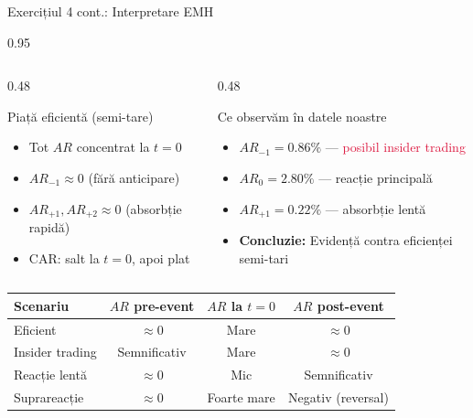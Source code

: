 \documentclass[9pt, aspectratio=169, t]{beamer}
\begin{document}
\begin{frame}{Exercițiul 4 cont.: Interpretare EMH}
    \begin{cminipage}{0.95\textwidth}
\begin{columns}[T]
\begin{column}{0.48\textwidth}
\begin{block}{Piață eficientă (semi-tare)}
\begin{itemize}\setlength{\itemsep}{0pt}
    \item Tot $AR$ concentrat la $t=0$
    \item $AR_{-1} \approx 0$ (fără anticipare)
    \item $AR_{+1}, AR_{+2} \approx 0$ (absorbție rapidă)
    \item CAR: salt la $t=0$, apoi plat
\end{itemize}
\end{block}
\end{column}
\begin{column}{0.48\textwidth}
\begin{block}{Ce observăm în datele noastre}
\begin{itemize}\setlength{\itemsep}{0pt}
    \item $AR_{-1} = 0.86\%$ --- \textcolor{Crimson}{posibil insider trading}
    \item $AR_0 = 2.80\%$ --- reacție principală
    \item $AR_{+1} = 0.22\%$ --- absorbție lentă
    \item \textbf{Concluzie:} Evidență contra eficienței semi-tari
\end{itemize}
\end{block}
\end{column}
\end{columns}

\vspace{0.3cm}
\renewcommand{\arraystretch}{1.2}
\begin{center}
\footnotesize
\begin{tabular}{lccc}
\toprule
\textbf{Scenariu} & \textbf{$AR$ pre-event} & \textbf{$AR$ la $t=0$} & \textbf{$AR$ post-event} \\
\midrule
Eficient & $\approx 0$ & Mare & $\approx 0$ \\
Insider trading & Semnificativ & Mare & $\approx 0$ \\
Reacție lentă & $\approx 0$ & Mic & Semnificativ \\
Suprareacție & $\approx 0$ & Foarte mare & Negativ (reversal) \\
\bottomrule
\end{tabular}
\end{center}
    \end{cminipage}
\end{frame}
\end{document}
